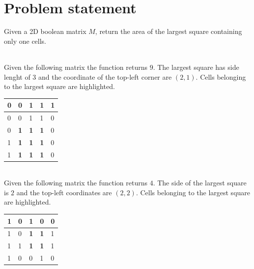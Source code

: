 \section{Problem statement}
\begin{exercise}
Given a 2D boolean matrix $M$, return the area of the largest square containing only one cells.
	\begin{example}
		\hfill \\
		Given the following matrix the function returns $9$. The largest square has side lenght of
		$3$ and the coordinate of the top-left corner are $(2,1)$. Cells belonging to the largest
		square are highlighted.

		\begin{tabular}{|l|l|l|l|l|}
		\hline
		0 & 0                                  & 1                                  & 1 & 1 \\
		\hline
		0 & 0                                  & 1                                  & 1 & 0 \\
		\hline
		0 & \cellcolor[HTML]{32CB00}\textbf{1} & \cellcolor[HTML]{32CB00}\textbf{1} &
		\cellcolor[HTML]{32CB00}\textbf{1} & 0 \\ \hline
		1 & \cellcolor[HTML]{32CB00}\textbf{1} & \cellcolor[HTML]{32CB00}\textbf{1} &
		\cellcolor[HTML]{32CB00}\textbf{1} & 0 \\ \hline
		1 & \cellcolor[HTML]{32CB00}\textbf{1} & \cellcolor[HTML]{32CB00}\textbf{1} &
		\cellcolor[HTML]{32CB00}\textbf{1} & 0 \\ \hline
		\end{tabular}
		
	\end{example}

	\begin{example}
		\hfill \\
		Given the following matrix the function returns $4$. The side of the largest square is $2$
		and the top-left coordinates are $(2,2)$. Cells belonging to the largest square are
		highlighted.
		\begin{tabular}{|l|l|l|l|l|}
		\hline
		1 & 0 & 1                                  & 0                                  & 0 \\
		\hline
		1 & 0 & \cellcolor[HTML]{32CB00}\textbf{1} & \cellcolor[HTML]{32CB00}\textbf{1} & 1 \\
		\hline
		1 & 1 & \cellcolor[HTML]{32CB00}\textbf{1} & \cellcolor[HTML]{32CB00}\textbf{1} & 1 \\
		\hline
		1 & 0 & 0                                  & 1                                  & 0 \\
		\hline
\end{tabular}

	\end{example}

\end{exercise}


